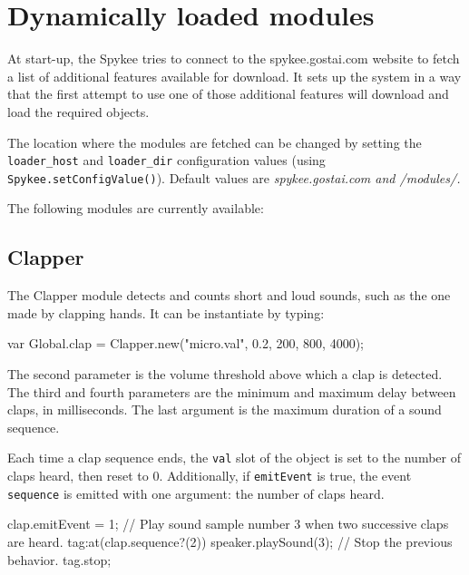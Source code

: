 \section{Dynamically loaded modules}
At start-up, the Spykee tries to connect to the spykee.gostai.com website to
fetch a list of additional features available for download.
It sets up the system in a way that the first attempt to use one of those
additional features will download and load the required objects.

The location where the modules are fetched can be changed by setting the
\lstinline|loader_host| and \lstinline|loader_dir| configuration values (using
\lstinline|Spykee.setConfigValue()|).
Default values are \em{spykee.gostai.com} and \em{/modules/}.

The following modules are currently available:

\subsection{Clapper}

The Clapper module detects and counts short and loud sounds, such as the one
made by clapping  hands. It can be instantiate by typing:

\begin{urbiunchecked}
var Global.clap = Clapper.new("micro.val", 0.2, 200, 800, 4000);
\end{urbiunchecked}

The second parameter is the volume threshold above which a clap is detected.
The third and fourth parameters are the minimum and maximum delay between claps,
in milliseconds. The last argument is the maximum duration of a sound sequence.

Each time a clap sequence ends, the \lstinline|val| slot of the object is
set to the number of claps heard, then reset to 0.
Additionally, if \lstinline|emitEvent| is true, the event \lstinline|sequence|
is emitted with one argument: the number of claps heard.

\begin{urbiunchecked}
clap.emitEvent = 1;
// Play sound sample number 3 when two successive claps are heard.
tag:at(clap.sequence?(2)) speaker.playSound(3);
// Stop the previous behavior.
tag.stop;
\end{urbiunchecked}


